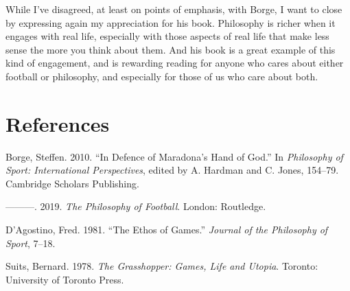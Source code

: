 \documentclass[
  11pt,
  letterpaper,
  DIV=11,
  numbers=noendperiod,
  oneside]{scrartcl}
\newlength{\cslhangindent}
\newenvironment{CSLReferences}[2] %
 {\begin{list}{}{%
  \setlength{\itemindent}{0pt}
  \setlength{\leftmargin}{0pt}
  \setlength{\parsep}{0pt}
  \ifodd #1
   \setlength{\leftmargin}{\cslhangindent}
   \setlength{\itemindent}{-1\cslhangindent}
  \fi
  \setlength{\itemsep}{#2\baselineskip}}}
 {\end{list}}
\begin{document}
While I've disagreed, at least on points of emphasis, with Borge, I want
to close by expressing again my appreciation for his book. Philosophy is
richer when it engages with real life, especially with those aspects of
real life that make less sense the more you think about them. And his
book is a great example of this kind of engagement, and is rewarding
reading for anyone who cares about either football or philosophy, and
especially for those of us who care about both.

\section*{References}\label{references}

\label{refs}
\begin{CSLReferences}{1}{0}
Borge, Steffen. 2010. {``In Defence of Maradona's Hand of God.''} In
\emph{Philosophy of Sport: International Perspectives}, edited by A.
Hardman and C. Jones, 154--79. Cambridge Scholars Publishing.

---------. 2019. \emph{The Philosophy of Football}. London: Routledge.

D'Agostino, Fred. 1981. {``The Ethos of Games.''} \emph{Journal of the
Philosophy of Sport}, 7--18.

Suits, Bernard. 1978. \emph{The Grasshopper: Games, Life and Utopia}.
Toronto: University of Toronto Press.

\end{CSLReferences}
\end{document}
